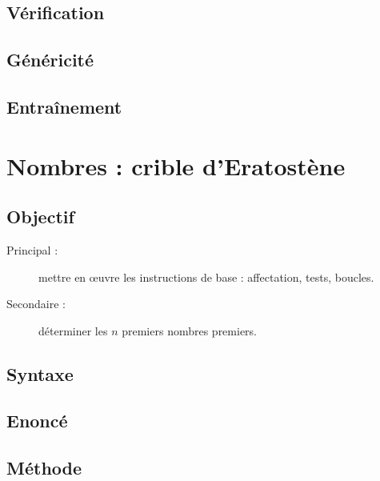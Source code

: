 \subsection{Vérification}\label{instructions:textes:verification}

\subsection{Généricité}\label{instructions:textes:genericite}

\subsection{Entraînement}\label{instructions:textes:entrainement}

\section{Nombres : crible d'Eratostène}\label{instructions:nombres}

\subsection{Objectif}\label{instructions:nombres:objectif}
\begin{description}
\item[Principal : ] mettre en \oe uvre les instructions de base : affectation, tests, boucles.
\item[Secondaire :] déterminer les $n$ premiers nombres premiers.
\end{description}


\subsection{Syntaxe \python}\label{instructions:nombres:python}

\subsection{Enoncé}\label{instructions:nombres:enonce}

\subsection{Méthode}\label{instructions:nombres:methode}

